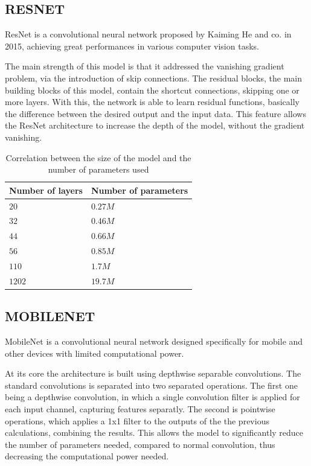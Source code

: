\subsection{RESNET}
\label{subsec:ch2sec2subsec2}
\par ResNet is a convolutional neural network proposed by Kaiming He and co. in 2015, achieving great performances in various computer vision tasks.
\par The main strength of this model is that it addressed the vanishing gradient problem, via the introduction of skip connections. The residual blocks, the main building blocks of this model, contain the shortcut connections, skipping one or more layers. With this, the network is able to learn  residual functions, basically the difference between the desired output and the input data. This feature allows the ResNet architecture to increase the depth of the model, without the gradient vanishing. \cite{he2015deep}

\begin{table}[htbp]
\begin{center}
\begin{tabular}
{|p{120pt}|p{120pt}|}
\hline
Number of layers & Number of parameters\\
\hline 
\hline $20$ & $0.27M$ \\
\hline $32$ & $0.46M$ \\
\hline $44$ & $0.66M$ \\
\hline $56$ & $0.85M$ \\
\hline $110$ & $1.7M$ \\
\hline $1202$ & $19.7M$ \\
\hline
\end{tabular}
\end{center}
\caption{Correlation between the size of the model and the number of parameters used \cite{he2015deep}}
\label{ResNetTable}
\end{table}

\subsection{MOBILENET}
\label{subsec:ch2sec2subsec3}
\par MobileNet is a convolutional neural network designed specifically for mobile and other devices with limited computational power.
\par At its core the architecture is built using depthwise separable convolutions. The standard convolutions is separated into two separated operations. The first one being a depthwise convolution, in which a single convolution filter is applied for each input channel, capturing features separatly. The second is pointwise operations, which applies a 1x1 filter to the outputs of the the previous calculations, combining the results. This allows the model to significantly reduce the number of parameters needed, compared to normal convolution, thus decreasing the computational power needed. \cite{howard2017mobilenets}

